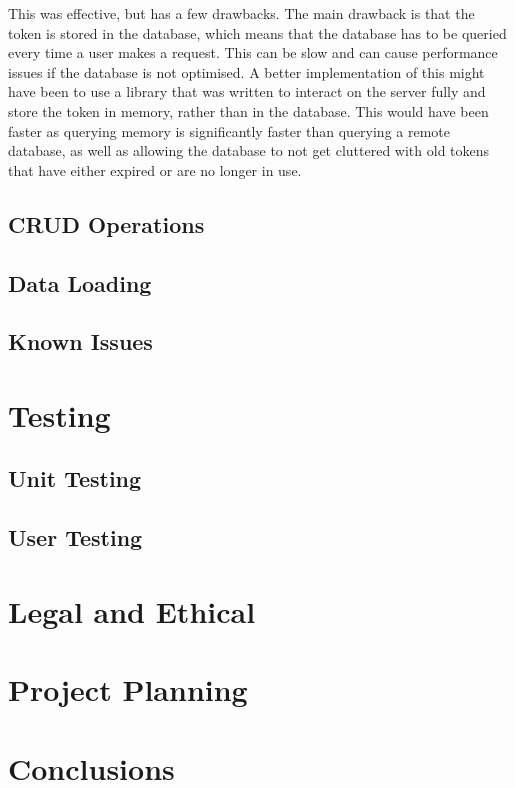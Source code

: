 \documentclass[12pt, a4paper,twoside]{report}
\theoremstyle{plain} %
\theoremstyle{definition} %
\numberwithin{equation}{chapter}
\begin{document}
This was effective, but has a few drawbacks. The main drawback is that the token
is stored in the database, which means that the database has to be queried every
time a user makes a request. This can be slow and can cause performance issues if
the database is not optimised. A better implementation of this might have been to
use a library that was written to interact on the server fully and store the token
in memory, rather than in the database. This would have been faster as querying
memory is significantly faster than querying a remote database, as well as allowing
the database to not get cluttered with old tokens that have either expired or are
no longer in use.

\section{CRUD Operations}\label{sec:crudoperations}



\section{Data Loading}\label{sec:dataloading}

\section{Known Issues}\label{sec:knownissues}

\chapter{Testing}\label{ch:testing}

\section{Unit Testing}\label{sec:unittesting}

\section{User Testing}\label{sec:usertesting}

\chapter{Legal and Ethical}\label{ch:legalandethical}

\chapter{Project Planning}\label{ch:projectplanning}

\chapter{Conclusions}\label{ch:conclusion}



\end{document}

